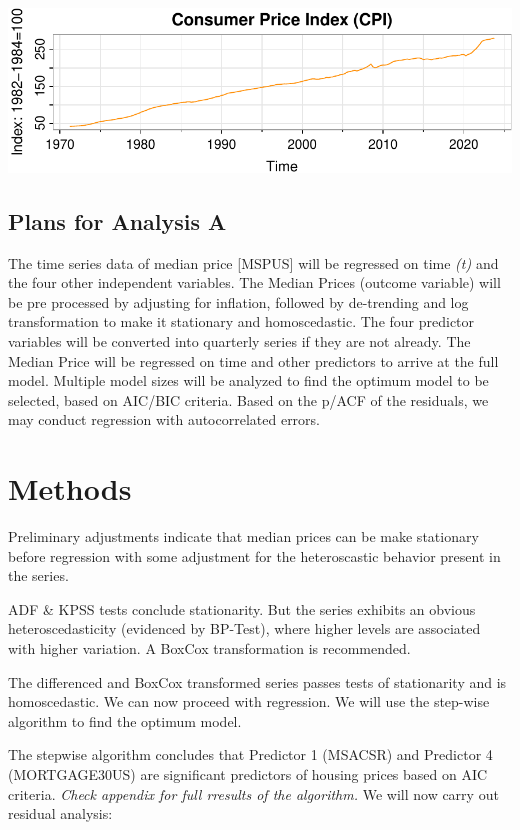 \documentclass[
  man]{apa6}
\begin{document}
\includegraphics{STAT429Report---Copy_files/figure-latex/unnamed-chunk-7-1.pdf}

\subsection{Plans for Analysis A}\label{plans-for-analysis-a}

The time series data of median price {[}MSPUS{]} will be regressed on time \emph{(t)} and the four other independent variables. The Median Prices (outcome variable) will be pre processed by adjusting for inflation, followed by de-trending and log transformation to make it stationary and homoscedastic. The four predictor variables will be converted into quarterly series if they are not already. The Median Price will be regressed on time and other predictors to arrive at the full model. Multiple model sizes will be analyzed to find the optimum model to be selected, based on AIC/BIC criteria. Based on the p/ACF of the residuals, we may conduct regression with autocorrelated errors.

\section{Methods}\label{methods}

Preliminary adjustments indicate that median prices can be make stationary before regression with some adjustment for the heteroscastic behavior present in the series.

ADF \& KPSS tests conclude stationarity. But the series exhibits an obvious heteroscedasticity (evidenced by BP-Test), where higher levels are associated with higher variation. A BoxCox transformation is recommended.

The differenced and BoxCox transformed series passes tests of stationarity and is homoscedastic. We can now proceed with regression. We will use the step-wise algorithm to find the optimum model.

The stepwise algorithm concludes that Predictor 1 (MSACSR) and Predictor 4 (MORTGAGE30US) are significant predictors of housing prices based on AIC criteria. \emph{Check appendix for full rresults of the algorithm.} We will now carry out residual analysis:
\end{document}
